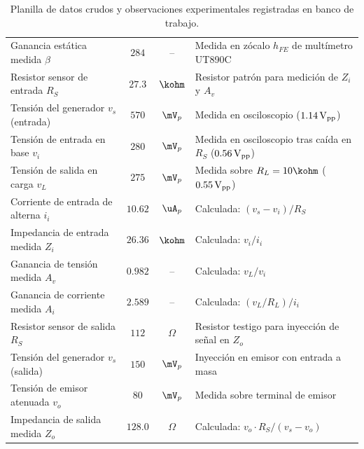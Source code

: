 \begin{table}[!ht]
{\begin{tabular}{|l|c|c|l|}
    Ganancia estática medida $\beta$ & $284$ & -- & Medida en zócalo $h_{FE}$ de multímetro UT890C \\
    Resistor sensor de entrada $R_S$ & $27.3$ & $\kohm$ & Resistor patrón para medición de $Z_i$ y $A_v$ \\
    Tensión del generador $v_s$ (entrada) & $570$ & $\mV_p$ & Medida en osciloscopio ($1.14\,\mathrm{V}_{\mathrm{pp}}$) \\
    Tensión de entrada en base $v_i$ & $280$ & $\mV_p$ & Medida en osciloscopio tras caída en $R_S$ ($0.56\,\mathrm{V}_{\mathrm{pp}}$) \\
    Tensión de salida en carga $v_L$ & $275$ & $\mV_p$ & Medida sobre $R_L = 10\kohm$ ($0.55\,\mathrm{V}_{\mathrm{pp}}$) \\
    Corriente de entrada de alterna $i_i$ & $10.62$ & $\uA_p$ & Calculada: $(v_s - v_i) / R_S$ \\
    Impedancia de entrada medida $Z_i$ & $26.36$ & $\kohm$ & Calculada: $v_i / i_i$ \\
    Ganancia de tensión medida $A_v$ & $0.982$ & -- & Calculada: $v_L / v_i$ \\
    Ganancia de corriente medida $A_i$ & $2.589$ & -- & Calculada: $(v_L/R_L) / i_i$ \\
    Resistor sensor de salida $R_S$ & $112$ & $\Omega$ & Resistor testigo para inyección de señal en $Z_o$ \\
    Tensión del generador $v_s$ (salida) & $150$ & $\mV_p$ & Inyección en emisor con entrada a masa \\
    Tensión de emisor atenuada $v_o$ & $80$ & $\mV_p$ & Medida sobre terminal de emisor \\
    Impedancia de salida medida $Z_o$ & $128.0$ & $\Omega$ & Calculada: $v_o \cdot R_S / (v_s - v_o)$ \\
    \hline
  \end{tabular}
  }
  \caption{Planilla de datos crudos y observaciones experimentales registradas en banco de trabajo.}
  \label{tab:planilla_cruda_tp4}
\end{table}
